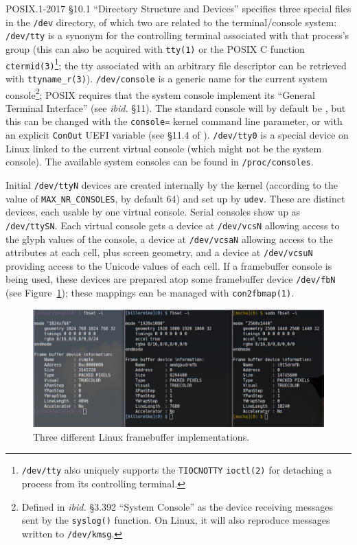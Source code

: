 POSIX.1-2017\cite{posix2017} §10.1 ``Directory Structure and Devices''
specifies three special files in the \texttt{/dev} directory, of which two are
related to the terminal/console system: \texttt{/dev/tty} is a synonym for the
controlling terminal associated with that process's group (this can also be
acquired with \texttt{tty(1)} or the POSIX C function
\texttt{ctermid(3)}\footnote{\texttt{/dev/tty} also uniquely supports the
  \texttt{TIOCNOTTY} \texttt{ioctl(2)} for detaching a process from its
  controlling terminal.}; the tty associated with an arbitrary file descriptor
can be retrieved with \texttt{ttyname\_r(3)}). \texttt{/dev/console} is a
generic name for the current system console\footnote{Defined in \textit{ibid.}
  §3.392 ``System Console'' as the device receiving messages sent by the
  \texttt{syslog()} function. On Linux, it will also reproduce messages written
  to \texttt{/dev/kmsg}\cite{dmesg}.}; POSIX requires that the system console
implement its ``General Terminal Interface'' (see \textit{ibid.} §11). The
standard console will by default be , but this can be changed
with the \texttt{console=} kernel command line parameter, or with an explicit
\texttt{ConOut} UEFI variable (see §11.4 of \cite{uefi}). \texttt{/dev/tty0} is
a special device on Linux linked to the current virtual console (which might
not be the system console). The available system consoles can be found in
\texttt{/proc/consoles}.

Initial \texttt{/dev/ttyN} devices are created internally by the kernel
(according to the value of \texttt{MAX\_NR\_CONSOLES}, by default 64) and set
up by \texttt{udev}. These are distinct devices, each usable by one virtual
console. Serial consoles show up as \texttt{/dev/ttySN}\cite{ttys4}. Each
virtual console gets a device at \texttt{/dev/vcsN} allowing access to the
glyph values of the console, a device at \texttt{/dev/vcsaN} allowing access to
the attributes at each cell, plus screen geometry, and a device at \texttt{/dev/vcsuN}
providing access to the Unicode values of each cell\cite{vcs4}. If a framebuffer console
is being used, these devices are prepared atop some framebuffer device \texttt{/dev/fbN} (see
Figure~\ref{fig:framebuffers}); these mappings can be managed with \texttt{con2fbmap(1)}.

\begin{figure}[!htb]
  \centering
  \includegraphics[width=.75\linewidth]{media/framebuffers.png}
  \caption{Three different Linux framebuffer implementations.}
  \label{fig:framebuffers}
\end{figure}

